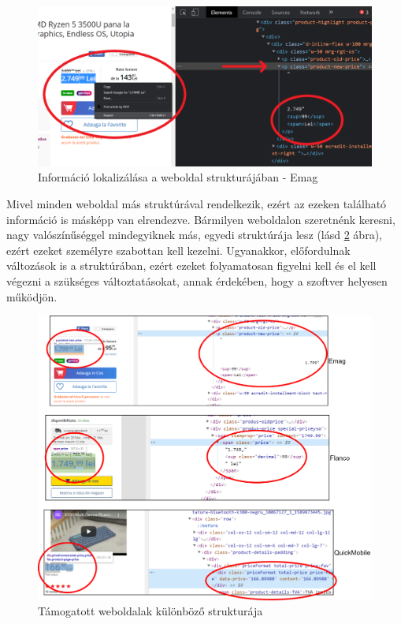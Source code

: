 \begin{figure}[H]
    \centering
    \includegraphics[scale=0.45]{figures/images/inspect_screenshot.png}
    \caption{Információ lokalizálása a weboldal strukturájában - Emag}
    \label{fig:inspect_screenshot}
\end{figure}

Mivel minden weboldal más struktúrával rendelkezik, ezért az ezeken található információ is másképp van elrendezve. Bármilyen weboldalon szeretnénk keresni, nagy valószínűséggel mindegyiknek más, egyedi struktúrája lesz (lásd \ref{fig:webshop_different_structure} ábra), ezért ezeket személyre szabottan kell kezelni. Ugyanakkor, előfordulnak változások is a struktúrában, ezért ezeket folyamatosan figyelni kell és el kell végezni a szükséges változtatásokat, annak érdekében, hogy a szoftver helyesen működjön. 

\begin{figure}[H]
    \centering
    \includegraphics[scale=0.95]{figures/images/webshop_different_structure.png}
    \caption{Támogatott weboldalak különböző strukturája}
    \label{fig:webshop_different_structure}
\end{figure}

